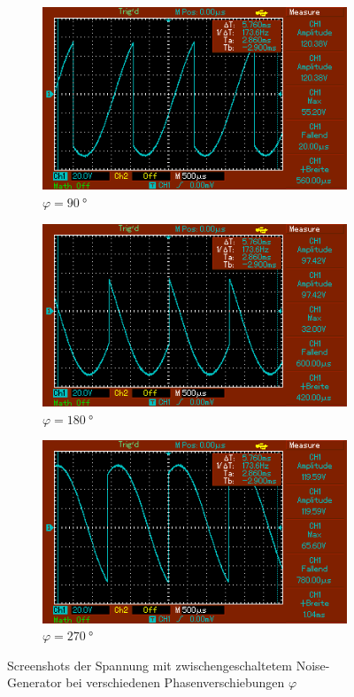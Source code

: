 \begin{figure}
\begin{subfigure}{0.3\textwidth}
        \centering
        \includegraphics[width=\textwidth]{images/2_90.png}
        \caption{$\varphi = \SI{90}{\degree}$}
        \label{fig:2_90}
    \end{subfigure}
    \par\medskip %
    \begin{subfigure}{0.3\textwidth}
        \centering
        \includegraphics[width=\textwidth]{images/2_180.png}
        \caption{$\varphi = \SI{180}{\degree}$}
        \label{fig:2_180}
    \end{subfigure}
    \begin{subfigure}{0.3\textwidth}
        \centering
        \includegraphics[width=\textwidth]{images/2_270.png}
        \caption{$\varphi = \SI{270}{\degree}$}
        \label{fig:2_270}
    \end{subfigure}
    \caption{Screenshots der Spannung mit zwischengeschaltetem Noise-Generator bei verschiedenen Phasenverschiebungen $\varphi$}
    \label{fig:2}
\end{figure}